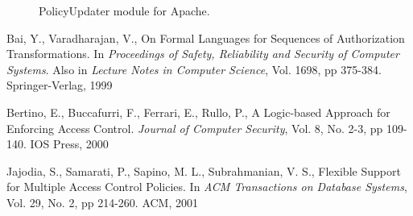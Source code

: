 \documentclass{llncs}
\begin{document}

  \vspace{-0.5cm}

    \begin{figure}[h]
      \begin{center}
        \caption{PolicyUpdater module for Apache.}
        \label{fig-1}
      \end{center}
    \end{figure}

  \vspace{-1.70cm}

  \begin{thebibliography}{5}
      Bai, Y., Varadharajan, V.,
      On Formal Languages for Sequences of Authorization Transformations.
      In \emph{Proceedings of Safety, Reliability and Security of Computer
      Systems}. Also in \emph{Lecture Notes in Computer Science},
      Vol. 1698, pp 375-384. Springer-Verlag, 1999

      Bertino, E., Buccafurri, F., Ferrari, E., Rullo, P.,
      A Logic-based Approach for Enforcing Access Control.
      \emph{Journal of Computer Security},
      Vol. 8, No. 2-3,
      pp 109-140.
      IOS Press, 2000

      Jajodia, S., Samarati, P., Sapino, M. L., Subrahmanian, V. S.,
      Flexible Support for Multiple Access Control Policies.
      In \emph{ACM Transactions on Database Systems},
      Vol. 29, No. 2,
      pp 214-260.
      ACM, 2001
  \end{thebibliography}
\end{document}
